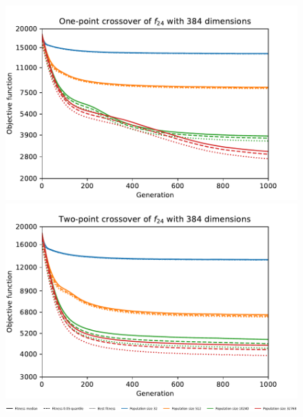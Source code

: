 \begin{figure}[ht!]
\begin{minipage}[t]{0.32\textwidth}
    \end{minipage}
    \\
    \centering
    \begin{minipage}[t]{0.32\textwidth}
        \includegraphics[width=\textwidth]{img/runs/fitness_es_crossover_f24_dim384_OnePoint1D.pdf}
    \end{minipage}
    \begin{minipage}[t]{0.32\textwidth}
        \centering
        \includegraphics[width=\textwidth]{img/runs/fitness_es_crossover_f24_dim384_TwoPoint1D.pdf}
    \end{minipage}

    \begin{minipage}{\textwidth}
        \centering
        \includegraphics[width=\textwidth]{img/runs/fitness_es_crossovers_legend.pdf}
    \end{minipage}

    \caption[Fitness of crossover operators]{}
\end{figure}




